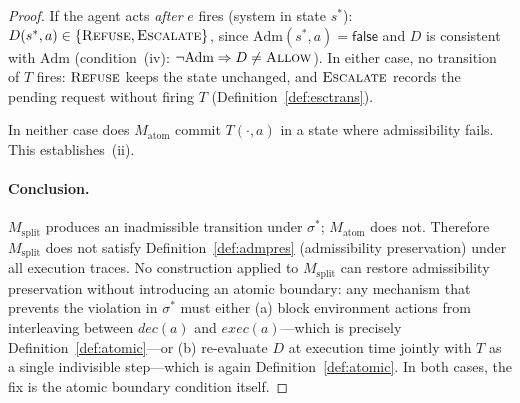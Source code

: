 \documentclass[11pt]{article}
\theoremstyle{plain}
\theoremstyle{definition}
\theoremstyle{remark}
\newcommand{\Allow}{\textsc{Allow}}
\newcommand{\Refuse}{\textsc{Refuse}}
\newcommand{\Escalate}{\textsc{Escalate}}
\newcommand{\Adm}{\mathrm{Adm}}
\begin{document}
\begin{proof}
If the agent acts \emph{after} $e$ fires (system in state $s^*$):
$D(s^*, a) \in \{\Refuse, \Escalate\}$, since $\Adm(s^*, a) = \mathsf{false}$
and $D$ is consistent with $\Adm$ (condition~(iv): $\neg\Adm \Rightarrow D \neq \Allow$).
In either case, no transition of $T$ fires: $\Refuse$ keeps the state unchanged,
and $\Escalate$ records the pending request without firing $T$
(Definition~\ref{def:esctrans}).

In neither case does $M_{\mathrm{atom}}$ commit $T(\cdot, a)$ in a state
where admissibility fails.  This establishes~(ii).

\paragraph{Conclusion.}
$M_{\mathrm{split}}$ produces an inadmissible transition under $\sigma^*$;
$M_{\mathrm{atom}}$ does not.  Therefore $M_{\mathrm{split}}$ does not satisfy
Definition~\ref{def:admpres} (admissibility preservation) under all execution
traces.  No construction applied to $M_{\mathrm{split}}$ can restore
admissibility preservation without introducing an atomic boundary: any
mechanism that prevents the violation in $\sigma^*$ must either
(a) block environment actions from interleaving between $\mathit{dec}(a)$ and
$\mathit{exec}(a)$---which is precisely Definition~\ref{def:atomic}---or
(b) re-evaluate $D$ at execution time jointly with $T$ as a single
indivisible step---which is again Definition~\ref{def:atomic}.  In both cases,
the fix is the atomic boundary condition itself.
\end{proof}
\end{document}
